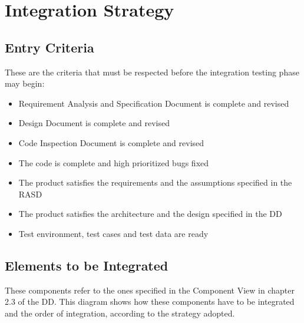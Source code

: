 \documentclass[18pt,oneside,a4paper, titlepage]{article}
\begin{document}
\newpage
\section{Integration Strategy}
	\subsection{Entry Criteria}	
		These are the criteria that must be respected before the integration testing phase may begin:
		\begin{itemize}
			\item Requirement Analysis and Specification Document is complete and revised
			\item Design Document is complete and revised
			\item Code Inspection Document is complete and revised
			\item The code is complete and high prioritized bugs fixed
			\item The product satisfies the requirements and the assumptions specified in the RASD
			\item The product satisfies the architecture and the design specified in the DD
			\item Test environment, test cases and test data are ready
		\end{itemize}	
	\newpage
	\subsection{Elements to	be Integrated}
		These components refer to the ones specified in the Component View in chapter 2.3 of the DD. This diagram shows how these components have to be integrated and the order of integration, according to the strategy adopted.
		
		\vspace{0.5cm}
		
\end{document}
